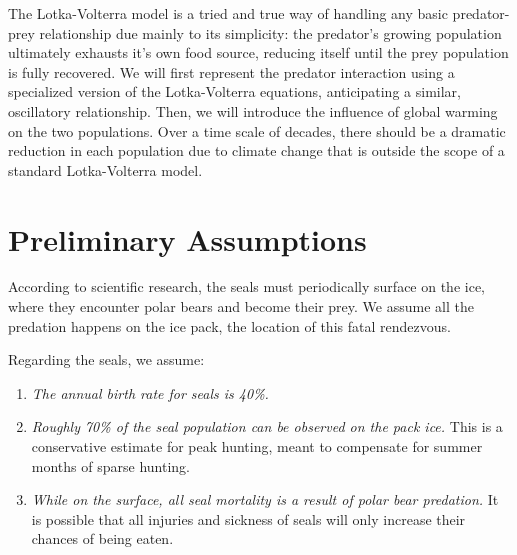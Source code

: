 \documentclass[reqno,11pt]{amsart}
\begin{document}
The Lotka-Volterra model is a tried and true way of handling any basic predator-prey relationship due mainly to its simplicity: the predator’s growing population ultimately exhausts it’s own food source, reducing itself until the prey population is fully recovered.\cite{Lotka} We will first represent the predator interaction using a specialized version of the Lotka-Volterra equations, anticipating a similar, oscillatory relationship. Then, we will introduce the influence of global warming on the two populations. Over a time scale of decades, there should be a dramatic reduction in each population due to climate change that is outside the scope of a standard Lotka-Volterra model.

\section{Preliminary Assumptions}
\label{sec:assumptions}
According to scientific research, the seals must periodically surface on the ice, where they encounter polar bears and become their prey.  We assume all the predation happens on the ice pack, the location of this fatal rendezvous. 

Regarding the seals, we assume:
\begin{enumerate}
\item \emph{The annual birth rate for seals is 40\%.}\cite{Seals}
\item \emph{Roughly 70\% of the seal population can be observed on the pack ice.} This is a conservative estimate for peak hunting, meant to compensate for summer months of sparse hunting.\cite{Seals}
\item \emph{While on the surface, all seal mortality is a result of polar bear predation.} It is possible that all injuries and sickness of seals will only increase their chances of being eaten.\cite{Stirling}
\end{enumerate}
\end{document}
